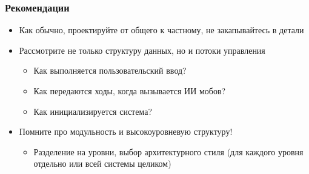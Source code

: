 \documentclass{../../slides-style}
\begin{document}
    \begin{frame}
        \frametitle{Рекомендации}
        \begin{itemize}
            \item Как обычно, проектируйте от общего к частному, не закапывайтесь в детали
            \item Рассмотрите не только структуру данных, но и потоки управления
            \begin{itemize}
                \item Как выполняется пользовательский ввод?
                \item Как передаются ходы, когда вызывается ИИ мобов?
                \item Как инициализируется система?
            \end{itemize}
            \item Помните про модульность и высокоуровневую структуру!
            \begin{itemize}
                \item Разделение на уровни, выбор архитектурного стиля (для каждого уровня отдельно или всей системы целиком)
            \end{itemize}
        \end{itemize}
    \end{frame}
\end{document}
